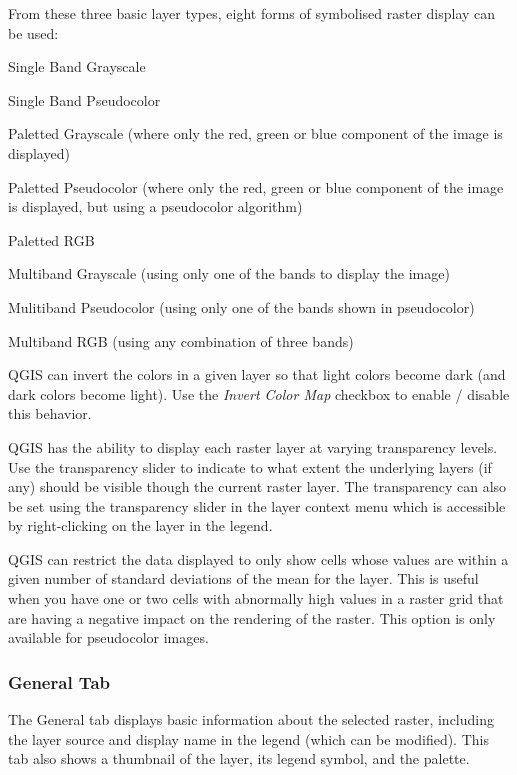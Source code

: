 From these three basic layer types, eight forms of symbolised raster display can
be used:
\begin{compactenum}

\item Single Band Grayscale
\item Single Band Pseudocolor
\item Paletted Grayscale (where only the red, green or blue component of the image is displayed)
\item Paletted Pseudocolor (where only the red, green or blue component of the image is displayed, but using a pseudocolor algorithm)
\item Paletted RGB
\item Multiband Grayscale (using only one of the bands to display the image)
\item Mulitiband Pseudocolor (using only one of the bands shown in pseudocolor)
\item Multiband RGB (using any combination of three bands)
\end{compactenum}
\smallskip
QGIS can invert the colors in a given layer so that light colors become dark
(and dark colors become light). Use the \textsl{Invert Color Map} checkbox to
enable / disable this behavior.

QGIS has the ability to display each raster layer at varying transparency
levels. Use the transparency slider to indicate to what extent the underlying layers (if any) should be visible though the current raster layer. The transparency can also be set using the transparency slider in the layer context menu which is accessible by right-clicking on the layer in the legend.

QGIS can restrict the data displayed to only show cells whose values are within
a given number of standard deviations of the mean for the
layer. This is useful when you have one or two cells with abnormally high values in a raster grid that are having a negative impact on the rendering of the raster. This option is only available for pseudocolor images.

\subsubsection{General Tab}
The General tab displays basic information about the selected raster, including
the layer source and  display name in the legend (which can be modified). This
tab also shows a thumbnail of the layer, its legend symbol, and the
palette.

